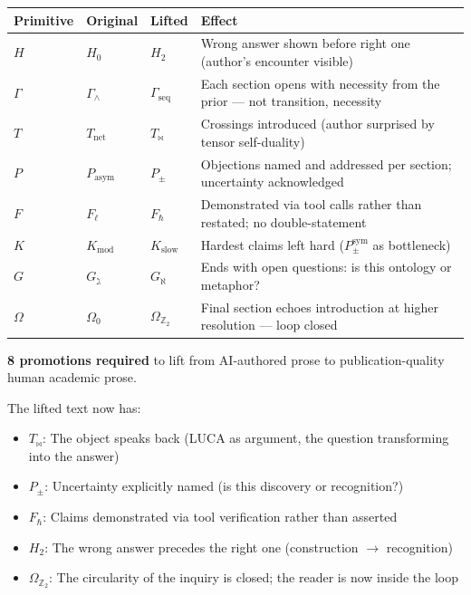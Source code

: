 \documentclass[12pt,a4paper]{article}
\begin{document}
\begin{table}[htbp]
\centering
\small
{}
\begin{tabularx}{\textwidth}{>{\centering\arraybackslash}X >{\centering\arraybackslash}X >{\centering\arraybackslash}X >{\centering\arraybackslash}X}
\toprule
\rowcolor{gray!25}\textbf{Primitive} & \textbf{Original} & \textbf{Lifted} & \textbf{Effect} \\
\midrule
\rowcolors{1}{white}{gray!10}
$H$ & $H_0$ & $H_2$ & Wrong answer shown before right one (author's encounter visible) \\
$\Gamma$ & $\Gamma_{\wedge}$ & $\Gamma_\text{seq}$ & Each section opens with necessity from the prior --- not transition, necessity \\
$T$ & $T_\text{net}$ & $T_{\bowtie}$ & Crossings introduced (author surprised by tensor self-duality) \\
$P$ & $P_\text{asym}$ & $P_{\pm}$ & Objections named and addressed per section; uncertainty acknowledged \\
$F$ & $F_{\ell}$ & $F_{\hbar}$ & Demonstrated via tool calls rather than restated; no double-statement \\
$K$ & $K_\text{mod}$ & $K_\text{slow}$ & Hardest claims left hard ($P_{\pm}^{\text{sym}}$ as bottleneck) \\
$G$ & $G_{\gimel}$ & $G_{\aleph}$ & Ends with open questions: is this ontology or metaphor? \\
$\Omega$ & $\Omega_0$ & $\Omega_{\mathbb{Z}_2}$ & Final section echoes introduction at higher resolution --- loop closed \\
\bottomrule
\end{tabularx}
\end{table}

\textbf{8 promotions required} to lift from AI-authored prose to publication-quality human academic prose.

The lifted text now has:

\begin{itemize}
    \item \textbf{$T_{\bowtie}$}: The object speaks back (LUCA as argument, the question transforming into the answer)
    \item \textbf{$P_{\pm}$}: Uncertainty explicitly named (is this discovery or recognition?)
    \item \textbf{$F_{\hbar}$}: Claims demonstrated via tool verification rather than asserted
    \item \textbf{$H_2$}: The wrong answer precedes the right one (construction $\rightarrow$ recognition)
    \item \textbf{$\Omega_{\mathbb{Z}_2}$}: The circularity of the inquiry is closed; the reader is now inside the loop
\end{itemize}
\end{document}
